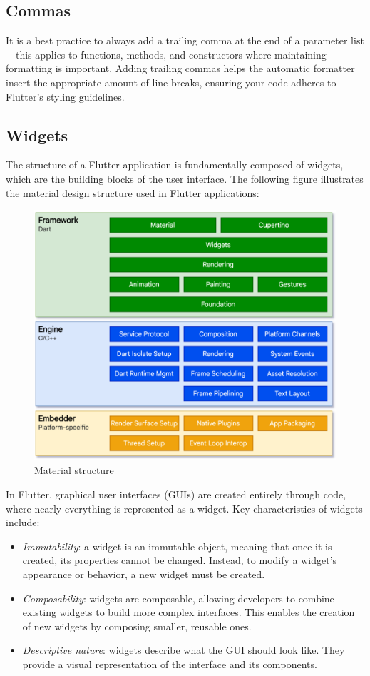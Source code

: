 \subsection{Commas}
It is a best practice to always add a trailing comma at the end of a parameter list—this applies to functions, methods, and constructors where maintaining formatting is important. 
Adding trailing commas helps the automatic formatter insert the appropriate amount of line breaks, ensuring your code adheres to Flutter's styling guidelines.

\subsection{Widgets}
The structure of a Flutter application is fundamentally composed of widgets, which are the building blocks of the user interface. 
The following figure illustrates the material design structure used in Flutter applications:
\begin{figure}[H]
    \centering
    \includegraphics[width=0.75\linewidth]{images/flutter.png}
    \caption{Material structure}
\end{figure}
In Flutter, graphical user interfaces (GUIs) are created entirely through code, where nearly everything is represented as a widget. 
Key characteristics of widgets include:
\begin{itemize}
    \item \textit{Immutability}: a widget is an immutable object, meaning that once it is created, its properties cannot be changed. 
        Instead, to modify a widget's appearance or behavior, a new widget must be created.
    \item \textit{Composability}: widgets are composable, allowing developers to combine existing widgets to build more complex interfaces. 
        This enables the creation of new widgets by composing smaller, reusable ones.
    \item \textit{Descriptive nature}: widgets describe what the GUI should look like. 
        They provide a visual representation of the interface and its components.
\end{itemize}
